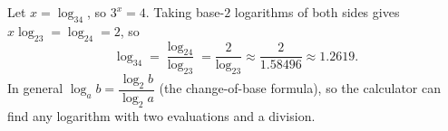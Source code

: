Let $x=\log_34$, so $3^x=4$. Taking base-$2$ logarithms of both sides gives $x\log_23=\log_24=2$, so
\[\log_34=\dfrac{\log_24}{\log_23}=\boxed{\dfrac{2}{\log_23}}\approx\dfrac{2}{1.58496}\approx1.2619.\]
In general $\log_ab=\dfrac{\log_2b}{\log_2a}$ (the change-of-base formula), so the calculator can find any logarithm with two evaluations and a division.
